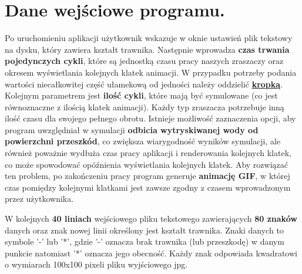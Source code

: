 \documentclass[a4paper]{article}
\begin{document}
\section{Dane wejściowe programu.}
Po uruchomieniu aplikacji użytkownik wskazuje w oknie ustawień plik tekstowy na dysku, który zawiera kształt trawnika. Następnie wprowadza \textbf{czas trwania pojedynczych cykli}, które są jednostką czasu pracy naszych zraszaczy oraz okresem wyświetlania kolejnych klatek animacji. W przypadku potrzeby podania wartości niecałkowitej część ułamekową od jedności należy oddzielić \textbf{\underline{kropką}}. Kolejnym parametrem jest \textbf{ilość cykli}, które mają być symulowane (co jest równoznaczne z ilością klatek animacji). Każdy typ zraszacza potrzebuje inną ilość czasu dla swojego pełnego obrotu. Istnieje możliwość zaznaczenia opcji, aby program uwzględniał w symulacji \textbf{odbicia wytryskiwanej wody od powierzchni przeszkód}, co zwiększa wiarygodność wyników symulacji, ale również poważnie wydłuża czas pracy aplikacji i renderowania kolejnych klatek, co może spowodować opóźnienia wyświetlania kolejnych klatek. Aby rozwiązać ten problem, po zakończeniu pracy program generuje \textbf{animację GIF}, w której czas pomiędzy kolejnymi klatkami jest zawsze zgodny z czasem wprowadzonym przez użytkownika.

W kolejnych \textbf{40 liniach} wejściowego pliku tekstowego zawierających \textbf{80 znaków} danych oraz znak nowej linii określony jest kształt trawnika. Znaki danych to symbole '-' lub '*', gdzie '-' oznacza brak trawnika (lub przeszkodę) w danym punkcie natomiast '*' oznacza jego obecność. Każdy znak odpowiada kwadratowi o wymiarach 100x100 pixeli pliku wyjściowego jpg.

\newpage
\end{document}
